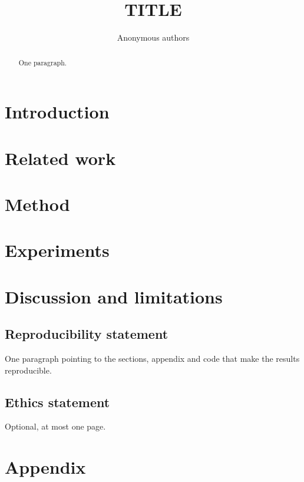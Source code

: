 \documentclass{article}
\title{TITLE}
\author{Anonymous authors}
\begin{document}
\maketitle

\begin{abstract}
One paragraph.
\end{abstract}

\section{Introduction}
\section{Related work}
\section{Method}
\section{Experiments}
\section{Discussion and limitations}

\subsection*{Reproducibility statement}
One paragraph pointing to the sections, appendix and code that make the results reproducible.
\subsection*{Ethics statement}
Optional, at most one page.





\appendix
\section{Appendix}
\end{document}
